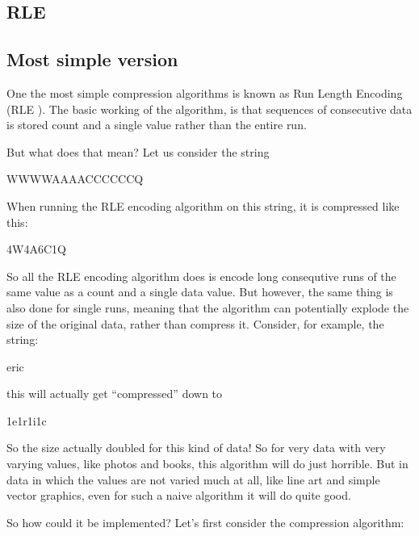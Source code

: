 \begin{refsection}
\section{RLE}
\label{sec:rle}

\subsection{Most simple version}
\label{sec:most-simple-version}

One the most simple compression algorithms is known as Run Length
Encoding (RLE
). \cite{nagarajan11:_enhan_approac_run_lengt_encod_schem}
The basic working of the algorithm, is that sequences of consecutive
data is stored count and a single value rather than the entire
run.

But what does that mean? Let us consider the string

\begin{indentpar}
  WWWWAAAACCCCCCQ
\end{indentpar}

When running the RLE encoding algorithm on this string, it is
compressed like this:

\begin{indentpar}
  4W4A6C1Q
\end{indentpar}

So all the RLE encoding algorithm does is encode long consequtive runs
of the same value as a count and a single data value. But however, the
same thing is also done for single runs, meaning that the algorithm
can potentially explode the size of the original data, rather than
compress it. Consider, for example, the string:

\begin{indentpar}
  eric
\end{indentpar}

this will actually get ``compressed'' down to

\begin{indentpar}
  1e1r1i1c
\end{indentpar}

So the size actually doubled for this kind of data! So for very data
with very varying values, like photos and books, this algorithm will
do just horrible. But in data in which the values are not varied much
at all, like line art and simple vector graphics, even for such a
naive algorithm it will do quite good.

So how could it be implemented? Let's first consider the compression algorithm:


\end{refsection}
